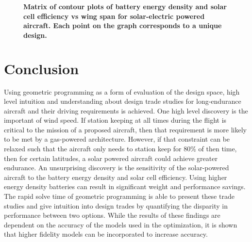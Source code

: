 \documentclass[]{aiaa-tc}%
\begin{document}
 \begin{figure}[H]
 \begin{subfigmatrix}{3}%
 \end{subfigmatrix}
 \caption{ \textbf{Matrix of contour plots of battery energy density and solar cell efficiency vs wing span for solar-electric powered aircraft. Each point on the graph corresponds to a unique design.} }
 \label{f:solarcontours}
\end{figure}


\section{Conclusion}

Using geometric programming as a form of evaluation of the design space, high level intuition and understanding about design trade studies for long-endurance aircraft and their driving requirements is achieved.  
One high level discovery is the important of wind speed.  
If station keeping at all times during the flight is critical to the mission of a proposed aircraft, then that requirement is more likely to be met by a gas-powered architecture.
However, if that constraint can be relaxed such that the aircraft only needs to station keep for 80\% of then time, then for certain latitudes, a solar powered aircraft could achieve greater endurance.
An unsurprising discovery is the sensitivity of the solar-powered aircraft to the battery energy density and solar cell efficiency.  Using higher energy density batteries can result in significant weight and performance savings.  
The rapid solve time of geometric programming is able to present these trade studies and give intuition into design trades by quantifying the disparity in performance between two options.
While the results of these findings are dependent on the accuracy of the models used in the optimization, it is shown that higher fidelity models can be incorporated to increase accuracy.
\end{document}
